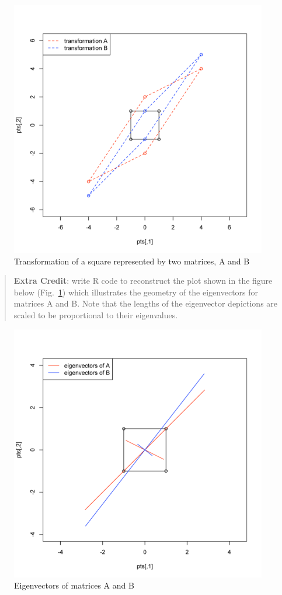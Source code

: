 \begin{figure}[htbp]
\centering
\includegraphics[width=0.8\columnwidth]{eigen-transform.png}
\caption{Transformation of a square represented by two matrices, A and
B}
\end{figure}

\begin{quote}
\textbf{Extra Credit}: write R code to reconstruct the plot shown in the
figure below (Fig.~\ref{fig:eigen}) which illustrates the geometry of the eigenvectors for
matrices A and B. Note that the lengths of the eigenvector depictions
are scaled to be proportional to their eigenvalues.

\end{quote}
\begin{figure}[htbp]
\centering
\includegraphics[width=0.8\columnwidth]{eigen-ECplot.png}
\caption{Eigenvectors of matrices A and B \label{fig:eigen}}
\end{figure}

